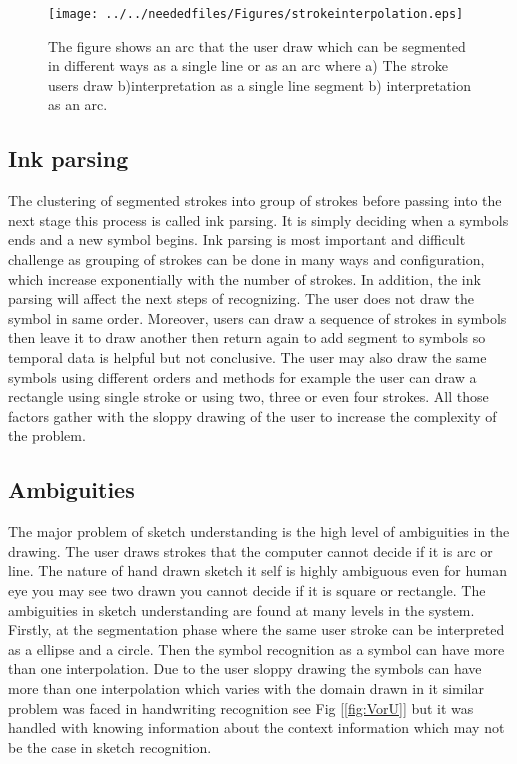 \begin{figure}

		\texttt{[image: ../../neededfiles/Figures/strokeinterpolation.eps]}
	\caption[Segmentation error]{The figure shows an arc that the user draw which can be segmented in different ways as a single line or as an arc where a) The stroke users draw  b)interpretation as a single line segment  b) interpretation as an arc.}
	\label{fig:strokeinterpolation}
\end{figure}



		

\subsection{Ink parsing}
\label{sec:InkParsing}

 The clustering of segmented strokes into group of strokes before passing into the next stage this process is called ink parsing. It is simply deciding when a symbols ends and a new symbol begins.  Ink parsing is most important and difficult challenge as grouping of strokes can be done in many ways and configuration, which increase exponentially with the number of strokes. In addition, the ink parsing will affect the next steps of recognizing. The user does not draw the symbol in same order. Moreover, users can draw a sequence of strokes in symbols then leave it to draw another then return again to add segment to symbols so temporal data is helpful but not conclusive.  The user may also draw the same symbols using different orders and methods for example the user can draw a rectangle using single stroke or using two, three or even four strokes. All those factors gather with the sloppy drawing of the user to increase the complexity of the problem.

\subsection{Ambiguities}
\label{sec:Ambiguities}
 	
The major problem of sketch understanding is the high level of ambiguities in the drawing. The user draws strokes that the computer cannot decide if it is arc or line. The nature of hand drawn sketch it self is highly ambiguous even for human eye you may see two drawn you cannot decide if it is square or rectangle.
 The ambiguities in sketch understanding are found at many levels in the system. Firstly, at the segmentation phase where the same user stroke can be interpreted as a ellipse and a circle. Then the symbol recognition as a symbol can have more than one interpolation. Due to the user sloppy drawing the symbols can have more than one interpolation which varies with the domain drawn in it similar problem was faced in handwriting recognition see Fig [\ref{fig:VorU}] but it was handled with knowing information about the context information which may not be the case in sketch recognition. 
 
